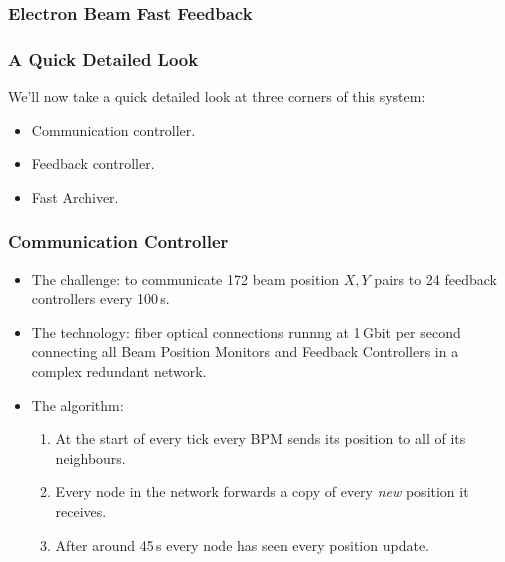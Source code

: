 \documentclass{beamer}
\begin{document}
%
\begin{frame}\frametitle{Electron Beam Fast Feedback}
\begin{center}

\end{center}
\end{frame}


%
\begin{frame}\frametitle{A Quick Detailed Look}

We'll now take a quick detailed look at three corners of this system:

\begin{itemize}
\item Communication controller.
\item Feedback controller.
\item Fast Archiver.
\end{itemize}

\end{frame}


%
\begin{frame}\frametitle{Communication Controller}

\begin{itemize}

\item
The challenge: to communicate 172 beam position $X, Y$ pairs to 24 feedback
controllers every 100\,\textmu s.

\item
The technology: fiber optical connections runnng at 1\,Gbit per second
connecting all Beam Position Monitors and Feedback Controllers in a complex
redundant network.

\item
The algorithm:

\begin{enumerate}
\item At the start of every tick every BPM sends its position to all of its
neighbours.
\item Every node in the network forwards a copy of every \emph{new} position it
receives.
\item After around 45\,\textmu s every node has seen every position update.
\end{enumerate}

\end{itemize}

\end{frame}
\end{document}
